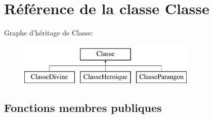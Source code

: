 \hypertarget{classClasse}{\section{Référence de la classe Classe}
\label{classClasse}
}
Graphe d'héritage de Classe\-:\begin{figure}[H]
\begin{center}
\leavevmode
\includegraphics[height=2.000000cm]{classClasse}
\end{center}
\end{figure}
\subsection*{Fonctions membres publiques}
